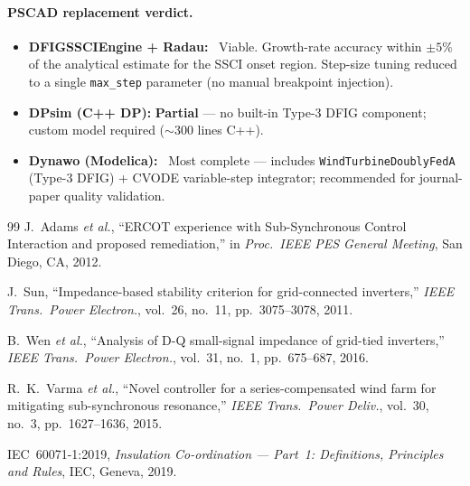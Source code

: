 \documentclass[11pt, a4paper]{article}
\begin{document}
\paragraph{PSCAD replacement verdict.}
\begin{itemize}
  \item \textbf{DFIGSSCIEngine + Radau:} \checkmark\ Viable.  Growth-rate
    accuracy within $\pm 5\%$ of the analytical estimate for the SSCI onset
    region.  Step-size tuning reduced to a single \texttt{max\_step} parameter
    (no manual breakpoint injection).
  \item \textbf{DPsim (C++ DP):} \textbf{Partial} --- no built-in Type-3 DFIG
    component; custom model required ($\sim$300 lines C++).
  \item \textbf{Dynawo (Modelica):} \checkmark\ Most complete --- includes
    \texttt{WindTurbineDoublyFedA} (Type-3 DFIG) + CVODE variable-step
    integrator; recommended for journal-paper quality validation.
\end{itemize}

\begin{thebibliography}{99}
J.~Adams \emph{et al.},
``ERCOT experience with Sub-Synchronous Control Interaction and proposed
remediation,''
in \emph{Proc.\ IEEE PES General Meeting}, San Diego, CA, 2012.

J.~Sun,
``Impedance-based stability criterion for grid-connected inverters,''
\emph{IEEE Trans.\ Power Electron.}, vol.~26, no.~11, pp.~3075--3078, 2011.

B.~Wen \emph{et al.},
``Analysis of D-Q small-signal impedance of grid-tied inverters,''
\emph{IEEE Trans.\ Power Electron.}, vol.~31, no.~1, pp.~675--687, 2016.

R.~K.~Varma \emph{et al.},
``Novel controller for a series-compensated wind farm for mitigating
sub-synchronous resonance,''
\emph{IEEE Trans.\ Power Deliv.}, vol.~30, no.~3, pp.~1627--1636, 2015.

IEC~60071-1:2019, \emph{Insulation Co-ordination --- Part~1: Definitions,
Principles and Rules}, IEC, Geneva, 2019.
\end{thebibliography}
\end{document}
